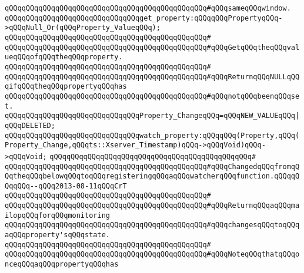 \verb|qQQqqQQqqQQqqQQqqQQqqQQqqQQqqQQqqQQqqQQqqQQqqQQq#qQQqsameqQQqwindow.|\newline
\newline
\newline
\newline
\verb|qQQqqQQqqQQqqQQqqQQqqQQqqQQqqQQqget_property:qQQqqQQqPropertyqQQq->qQQqNull_Or(qQQqProperty_ValueqQQq);|\newline
\verb|qQQqqQQqqQQqqQQqqQQqqQQqqQQqqQQqqQQqqQQqqQQqqQQq#|\newline
\verb|qQQqqQQqqQQqqQQqqQQqqQQqqQQqqQQqqQQqqQQqqQQqqQQq#qQQqGetqQQqtheqQQqvalueqQQqofqQQqtheqQQqproperty.|\newline
\verb|qQQqqQQqqQQqqQQqqQQqqQQqqQQqqQQqqQQqqQQqqQQqqQQq#|\newline
\verb|qQQqqQQqqQQqqQQqqQQqqQQqqQQqqQQqqQQqqQQqqQQqqQQq#qQQqReturnqQQqNULLqQQqifqQQqtheqQQqpropertyqQQqhas|\newline
\verb|qQQqqQQqqQQqqQQqqQQqqQQqqQQqqQQqqQQqqQQqqQQqqQQq#qQQqnotqQQqbeenqQQqset.|\newline
\newline
\newline
\newline
\verb|qQQqqQQqqQQqqQQqqQQqqQQqqQQqqQQqProperty_ChangeqQQq=qQQqNEW_VALUEqQQq|\verb#|qQQqDELETED;#\newline
\newline
\newline
\verb|qQQqqQQqqQQqqQQqqQQqqQQqqQQqqQQqwatch_property:qQQqqQQq(Property,qQQq(Property_Change,qQQqts::Xserver_Timestamp)qQQq->qQQqVoid)qQQq->qQQqVoid;|\newline
\verb|qQQqqQQqqQQqqQQqqQQqqQQqqQQqqQQqqQQqqQQqqQQqqQQq#|\newline
\verb|qQQqqQQqqQQqqQQqqQQqqQQqqQQqqQQqqQQqqQQqqQQqqQQq#qQQqChangedqQQqfromqQQqtheqQQqbelowqQQqtoqQQqregisteringqQQqaqQQqwatcherqQQqfunction.qQQqqQQqqQQq--qQQq2013-08-11qQQqCrT|\newline
\verb|qQQqqQQqqQQqqQQqqQQqqQQqqQQqqQQqqQQqqQQqqQQqqQQq#|\newline
\verb|qQQqqQQqqQQqqQQqqQQqqQQqqQQqqQQqqQQqqQQqqQQqqQQq#qQQqReturnqQQqaqQQqmailopqQQqforqQQqmonitoring|\newline
\verb|qQQqqQQqqQQqqQQqqQQqqQQqqQQqqQQqqQQqqQQqqQQqqQQq#qQQqchangesqQQqtoqQQqaqQQqproperty'sqQQqstate.|\newline
\verb|qQQqqQQqqQQqqQQqqQQqqQQqqQQqqQQqqQQqqQQqqQQqqQQq#|\newline
\verb|qQQqqQQqqQQqqQQqqQQqqQQqqQQqqQQqqQQqqQQqqQQqqQQq#qQQqNoteqQQqthatqQQqonceqQQqaqQQqpropertyqQQqhas|\newline

